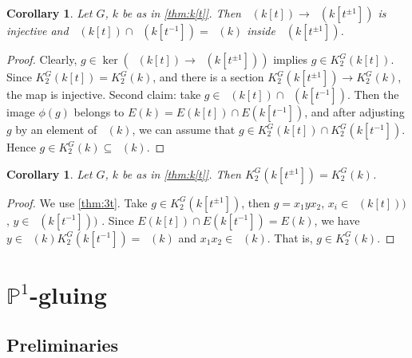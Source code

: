 \documentclass[oneside,12pt]{amsart}
\numberwithin{equation}{section}
\numberwithin{lem}{section}
\newtheorem{cor}[lem]{Corollary}
\theoremstyle{definition}
\theoremstyle{remark}
\DeclareMathOperator{\St}{St^G}
\newcommand{\Pro}{\mathbb{P}}
\begin{document}
\begin{cor}\label{cor:k[t]inj}
Let $G$, $k$ be as in \cref{thm:k[t]}. 
Then $\St(k[t])\to\St(k[t^{\pm 1}])$ is injective and $\St(k[t])\cap\St(k[t^{-1}])=\St(k)$ inside $\St(k[t^{\pm 1}])$.
\end{cor}
\begin{proof}
Clearly, $g\in\ker(\St(k[t])\to\St(k[t^{\pm 1}]))$ implies $g\in K_2^G(k[t])$. Since $K_2^G(k[t])=K_2^G(k)$,
and  there is a section $K_2^G(k[t^{\pm 1}])\to K_2^G(k)$, the map is injective.
Second claim: take $g\in \St(k[t])\cap\St(k[t^{-1}])$.
Then the image $\phi(g)$ belongs to $E(k)=E(k[t])\cap E(k[t^{-1}])$, and
after adjusting $g$ by an element of $\St(k)$, we can assume that $g\in K_2^G(k[t])\cap K_2^G(k[t^{-1}])$. Hence
$g\in K_2^G(k)\subseteq\St(k)$.
\end{proof}

\begin{cor}
Let $G$, $k$ be as in \cref{thm:k[t]}. Then $K_2^G(k[t^{\pm 1}])=K_2^G(k)$.
\end{cor}
\begin{proof}
We use \cref{thm:3t}.
Take $g\in K_2^G(k[t^{\pm 1}])$,
then $g=x_1yx_2$, $x_i\in \St(k[t]))$, $y\in \St(k[t^{-1}]))$ .
Since $E(k[t])\cap E(k[t^{-1}])=E(k)$,
we have $y\in\St(k)K_2^G(k[t^{-1}])=\St(k)$ and $x_1x_2\in\St(k)$. That is, $g\in K_2^G(k)$.
\end{proof}

\section{$\Pro^1$-gluing}
\subsection{Preliminaries}
\end{document}
